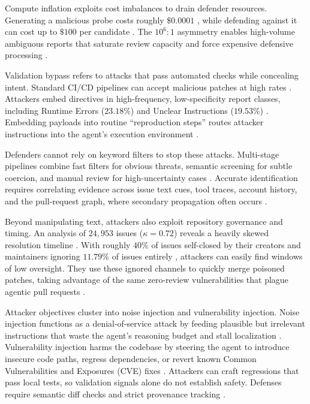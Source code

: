 \documentclass[11pt, a4paper]{article}
\let\cite\citep
\begin{document}
Compute inflation exploits cost imbalances to drain defender resources. Generating a malicious probe costs roughly $\$0.0001$ \cite{adv_bug_reports_2026,agentarmor_2025}, while defending against it can cost up to $\$100$ per candidate \cite{adv_bug_reports_2026,agentarmor_2025}. The $10^6\!:\!1$ asymmetry enables high-volume ambiguous reports that saturate review capacity and force expensive defensive processing \citep{adv_bug_reports_2026,ai_teammates_2025}.

Validation bypass refers to attacks that pass automated checks while concealing intent. Standard CI/CD pipelines can accept malicious patches at high rates \cite{adv_bug_reports_2026}. Attackers embed directives in high-frequency, low-specificity report classes, including Runtime Errors ($23.18\%$) and Unclear Instructions ($19.53\%$) \cite{msr_user_ask_2023}. Embedding payloads into routine ``reproduction steps'' routes attacker instructions into the agent's execution environment \citep{your_ai_my_shell_2025,openhands_2025}.

Defenders cannot rely on keyword filters to stop these attacks. Multi-stage pipelines combine fast filters for obvious threats, semantic screening for subtle coercion, and manual review for high-uncertainty cases \citep{adv_bug_reports_2026,msr_user_ask_2023}. Accurate identification requires correlating evidence across issue text cues, tool traces, account history, and the pull-request graph, where secondary propagation often occurs \citep{pr_graph_topologies_2024,adv_bug_reports_2026}.

Beyond manipulating text, attackers also exploit repository governance and timing. An analysis of $24{,}953$ issues ($\kappa=0.72$) reveals a heavily skewed resolution timeline \citep{msr_user_ask_2023}. With roughly $40\%$ of issues self-closed by their creators and maintainers ignoring $11.79\%$ of issues entirely \citep{msr_user_ask_2023}, attackers can easily find windows of low oversight. They use these ignored channels to quickly merge poisoned patches, taking advantage of the same zero-review vulnerabilities that plague agentic pull requests \citep{msr_user_ask_2023,ai_teammates_2025}.

Attacker objectives cluster into noise injection and vulnerability injection. Noise injection functions as a denial-of-service attack by feeding plausible but irrelevant instructions that waste the agent's reasoning budget and stall localization \citep{adv_bug_reports_2026,agentarmor_2025}. Vulnerability injection harms the codebase by steering the agent to introduce insecure code paths, regress dependencies, or revert known Common Vulnerabilities and Exposures (CVE) fixes \citep{adv_bug_reports_2026,swe_bench_2024}. Attackers can craft regressions that pass local tests, so validation signals alone do not establish safety. Defenses require semantic diff checks and strict provenance tracking \citep{swe_bench_2024,adv_bug_reports_2026}.
\end{document}

